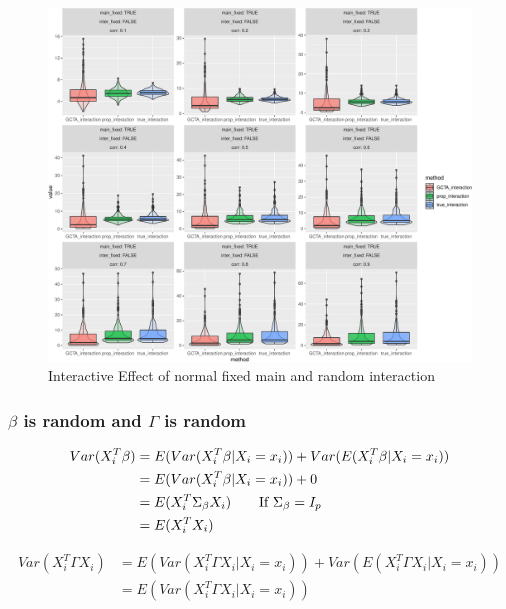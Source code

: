 \documentclass[]{article}
\begin{document}
\begin{figure}
\centering
\includegraphics{Simulation_report_files/figure-latex/inter_fixed_random_normal-1.pdf}
\caption{Interactive Effect of normal fixed main and random interaction}
\end{figure}

\clearpage

\subsubsection{\texorpdfstring{\(\beta\) is random and \(\Gamma\) is
random}{\textbackslash{}beta is random and \textbackslash{}Gamma is random}}\label{beta-is-random-and-gamma-is-random}

\begin{align*}
    Var(X_i^T\beta) &= E(Var(X_i^T\beta|X_i = x_i)) + Var(E(X_i^T\beta|X_i = x_i))\\
                    &= E(Var(X_i^T\beta|X_i = x_i)) + 0 \\
                    &= E(X_i^T \Sigma_{\beta} X_i)  \tag*{If $\Sigma_{\beta} = I_p$}\\
                    &= E(X_i^TX_i)
\end{align*}

\begin{align*}
    Var(X_i^T\Gamma X_i) &= E(Var(X_i^T\Gamma X_i|X_i = x_i)) + Var(E(X_i^T\Gamma X_i|X_i = x_i)) \\ 
                         &= E(Var(X_i^T\Gamma X_i|X_i = x_i))
\end{align*}
\end{document}
